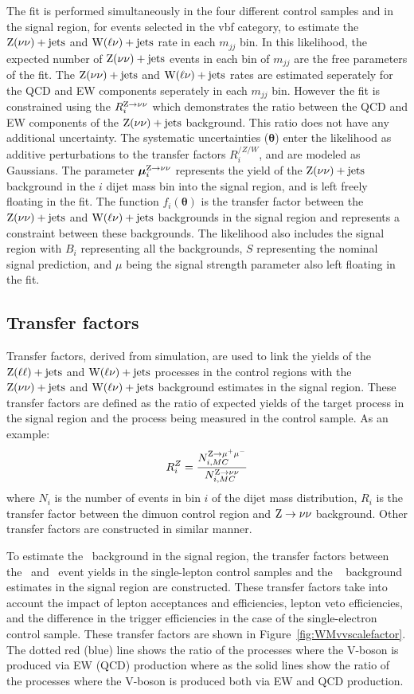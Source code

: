 The fit is performed simultaneously in the four different control samples and in the signal
region, for events selected in the vbf category, to estimate the $\mathrm{Z}(\nu\nu)+\textrm{jets}$ and $\mathrm{W}(\ell\nu)+\textrm{jets}$ rate
in each $m_{jj}$ bin. In this likelihood, the expected number of $\mathrm{Z}(\nu\nu)+\textrm{jets}$ events in each
bin of $m_{jj}$ are the free parameters of the fit.
The $\mathrm{Z}(\nu\nu)+\textrm{jets}$ and $\mathrm{W}(\ell\nu)+\textrm{jets}$ rates are estimated seperately for the
QCD and EW components seperately in each $m_{jj}$ bin. However the fit is constrained using the $R^{\mathrm{\mathrm{Z}\to\nu\nu}}_{i}$ which
demonstrates the ratio between the QCD and EW components of the $\mathrm{Z}(\nu\nu)+\textrm{jets}$ background. This ratio does not have any additional
uncertainty.
The systematic uncertainties ($\boldsymbol{\theta}$)
enter the likelihood as additive perturbations to the transfer factors $R^{/Z/W}_{i}$, and are modeled as Gaussians.
The parameter $\boldsymbol{\mu}_{i}^{\mathrm{Z}\to\nu\nu}$ represents the yield of the $\mathrm{Z}(\nu\nu)+\textrm{jets}$ background in the $i$ dijet mass
bin into the signal region, and is left freely floating in the fit. The function $f_{i}(\boldsymbol{\theta})$ is the
transfer factor between the $\mathrm{Z}(\nu\nu)+\textrm{jets}$ and $\mathrm{W}(\ell\nu)+\textrm{jets}$ backgrounds in the signal region and represents a constraint between
these backgrounds. The likelihood also includes the signal region  with $B_{i}$ representing all the backgrounds, $S$
representing the nominal signal prediction, and $\mu$ being the signal strength parameter also left floating in the fit.

\subsection{Transfer factors}

Transfer factors, derived from simulation,
are used to link the yields of the $\mathrm{Z}(\ell\ell)+\textrm{jets}$ and $\mathrm{W}(\ell\nu)+\textrm{jets}$ processes in the control
regions with the $\mathrm{Z}(\nu\nu)+\textrm{jets}$ and $\mathrm{W}(\ell\nu)+\textrm{jets}$ background estimates in the signal region.
These transfer factors are defined as the ratio of expected yields of the target process
in the signal region and the process being measured in the control sample. As an example:
\begin{equation}
R_{i}^{Z} = \frac{N_{i,MC}^{\mathrm{Z}\to\mu^+\mu^-}}{N_{i,MC}^{\mathrm{Z}\to\nu\nu}}
\end{equation}
where $N_{i}$ is the number of events in bin $i$ of the dijet mass distribution, $R_{i}$ is the transfer factor between the dimuon control region and $\mathrm{Z}\to\nu\nu$ background.
Other transfer factors are constructed in similar manner.

To estimate the \Wlvjets~background in the signal region, the transfer factors between
the \Wmvjets~and \Wevjets~event yields in the single-lepton control samples and
the \Wlvjets~ background estimates in the signal region are constructed. These transfer factors take into account
the impact of lepton acceptances and efficiencies, lepton veto efficiencies, and
the difference in the trigger efficiencies in the case of the single-electron control sample.
These transfer factors
are shown in Figure~\ref{fig:WMvvscalefactor}. The dotted red (blue) line shows the ratio of the processes where the V-boson
is produced via EW (QCD) production where as the solid lines show the ratio of the processes where the V-boson is produced both
via EW and QCD production.


